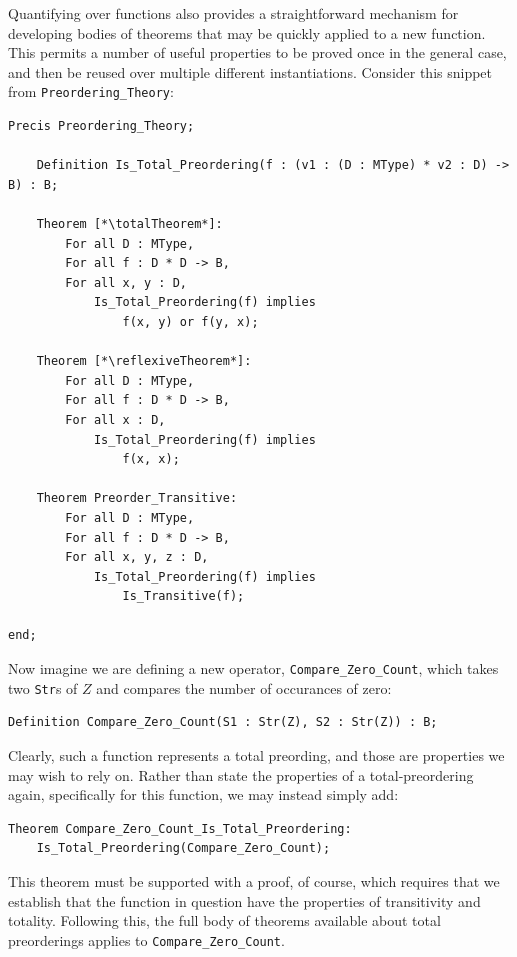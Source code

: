 Quantifying over functions also provides a straightforward mechanism for developing bodies of theorems that may be quickly applied to a new function.  This permits a number of useful properties to be proved once in the general case, and then be reused over multiple different instantiations.  Consider this snippet from \texttt{Preordering\_Theory}:

\newcommand{\reflexiveTheorem}{Preorder\_Reflexive}
\newcommand{\totalTheorem}{Total\_Preorder\_Is\_Total}

\begin{lstlisting}
Precis Preordering_Theory;

	Definition Is_Total_Preordering(f : (v1 : (D : MType) * v2 : D) -> B) : B;

	Theorem [*\totalTheorem*]:
		For all D : MType,
		For all f : D * D -> B,
		For all x, y : D,
			Is_Total_Preordering(f) implies
				f(x, y) or f(y, x);

	Theorem [*\reflexiveTheorem*]:
		For all D : MType,
		For all f : D * D -> B,
		For all x : D,
			Is_Total_Preordering(f) implies
				f(x, x);

	Theorem Preorder_Transitive:
		For all D : MType, 
		For all f : D * D -> B,
		For all x, y, z : D,
			Is_Total_Preordering(f) implies
				Is_Transitive(f);

end;
\end{lstlisting}

Now imagine we are defining a new operator, \texttt{Compare\_Zero\_Count}, which takes two \texttt{Str}s of $Z$ and compares the number of occurances of zero:

\begin{lstlisting}
Definition Compare_Zero_Count(S1 : Str(Z), S2 : Str(Z)) : B;
\end{lstlisting}

Clearly, such a function represents a total preording, and those are properties we may wish to rely on.  Rather than state the properties of a total-preordering again, specifically for this function, we may instead simply add:

\begin{lstlisting}
Theorem Compare_Zero_Count_Is_Total_Preordering:
	Is_Total_Preordering(Compare_Zero_Count);
\end{lstlisting} 

This theorem must be supported with a proof, of course, which requires that we establish that the function in question have the properties of transitivity and totality.  Following this, the full body of theorems available about total preorderings applies to \texttt{Compare\_Zero\_Count}.

